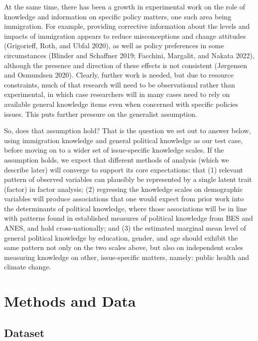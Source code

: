 \documentclass[12pt,halfline,a4paper,]{ouparticle}
\begin{document}
At the same time, there has been a growth in experimental work on the
role of knowledge and information on specific policy matters, one such
area being immigration. For example, providing corrective information
about the levels and impacts of immigration appears to reduce
misconceptions and change attitudes (Grigorieff, Roth, and Ubfal 2020),
as well as policy preferences in some circumstances (Blinder and
Schaffner 2019; Facchini, Margalit, and Nakata 2022), although the
presence and direction of these effects is not consistent (Jørgensen and
Osmundsen 2020). Clearly, further work is needed, but due to resource
constraints, much of that research will need to be observational rather
than experimental, in which case researchers will in many cases need to
rely on available general knowledge items even when concerned with
specific policies issues. This puts further pressure on the generalist
assumption.

So, does that assumption hold? That is the question we set out to answer
below, using immigration knowledge and general political knowledge as
our test case, before moving on to a wider set of issue-specific
knowledge scales. If the assumption holds, we expect that different
methods of analysis (which we describe later) will converge to support
its core expectations: that (1) relevant pattern of observed variables
can plausibly be represented by a single latent trait (factor) in factor
analysis; (2) regressing the knowledge scales on demographic variables
will produce associations that one would expect from prior work into the
determinants of political knowledge, where those associations will be in
line with patterns found in established measures of political knowledge
from BES and ANES, and hold cross-nationally; and (3) the estimated
marginal mean level of general political knowledge by education, gender,
and age should exhibit the same pattern not only on the two scales
above, but also on independent scales measuring knowledge on other,
issue-specific matters, namely: public health and climate change.

\hypertarget{methods-and-data}{%
\section{Methods and Data}\label{methods-and-data}}

\hypertarget{dataset}{%
\subsection{Dataset}\label{dataset}}
\end{document}
